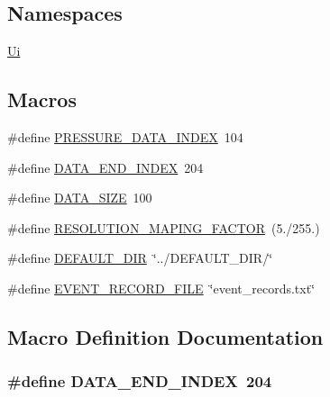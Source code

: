 \subsection*{Namespaces}
\begin{DoxyCompactItemize}
\item 
 \hyperlink{a00055}{Ui}
\end{DoxyCompactItemize}
\subsection*{Macros}
\begin{DoxyCompactItemize}
\item 
\#define \hyperlink{a00039_a56c4aa163f5d0c550eeb89fdb3f08996}{P\+R\+E\+S\+S\+U\+R\+E\+\_\+\+D\+A\+T\+A\+\_\+\+I\+N\+D\+E\+X}~104
\item 
\#define \hyperlink{a00039_a61d054f24da5242788747ba3db5dfa11}{D\+A\+T\+A\+\_\+\+E\+N\+D\+\_\+\+I\+N\+D\+E\+X}~204
\item 
\#define \hyperlink{a00039_af55149bc1f05cf18af067a302e31e3f9}{D\+A\+T\+A\+\_\+\+S\+I\+Z\+E}~100
\item 
\#define \hyperlink{a00039_a58055d345f4a971dad22c043135fb214}{R\+E\+S\+O\+L\+U\+T\+I\+O\+N\+\_\+\+M\+A\+P\+I\+N\+G\+\_\+\+F\+A\+C\+T\+O\+R}~(5./255.)
\item 
\#define \hyperlink{a00039_a63ec0cea9c1f0ca8a7893c2c53d2fd81}{D\+E\+F\+A\+U\+L\+T\+\_\+\+D\+I\+R}~\char`\"{}../D\+E\+F\+A\+U\+L\+T\+\_\+\+D\+I\+R/\char`\"{}
\item 
\#define \hyperlink{a00039_a8d4ad2cd60e024f6e0f37dbac40768a1}{E\+V\+E\+N\+T\+\_\+\+R\+E\+C\+O\+R\+D\+\_\+\+F\+I\+L\+E}~\char`\"{}event\+\_\+records.\+txt\char`\"{}
\end{DoxyCompactItemize}


\subsection{Macro Definition Documentation}
\hypertarget{a00039_a61d054f24da5242788747ba3db5dfa11}{
\subsubsection[{D\+A\+T\+A\+\_\+\+E\+N\+D\+\_\+\+I\+N\+D\+E\+X}]{\setlength{\rightskip}{0pt plus 5cm}\#define D\+A\+T\+A\+\_\+\+E\+N\+D\+\_\+\+I\+N\+D\+E\+X~204}}\label{a00039_a61d054f24da5242788747ba3db5dfa11}


